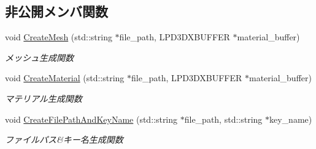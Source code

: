 \subsection*{非公開メンバ関数}
\begin{DoxyCompactItemize}
\item 
void \mbox{\hyperlink{class_model_x_object_a9808ef050cd3123ce72d8de2e07009da}{Create\+Mesh}} (std\+::string $\ast$file\+\_\+path, L\+P\+D3\+D\+X\+B\+U\+F\+F\+ER $\ast$material\+\_\+buffer)
\begin{DoxyCompactList}\small\item\em メッシュ生成関数 \end{DoxyCompactList}\item 
void \mbox{\hyperlink{class_model_x_object_a7ecf8b8515d10e21566e1d54b9dae5b0}{Create\+Material}} (std\+::string $\ast$file\+\_\+path, L\+P\+D3\+D\+X\+B\+U\+F\+F\+ER $\ast$material\+\_\+buffer)
\begin{DoxyCompactList}\small\item\em マテリアル生成関数 \end{DoxyCompactList}\item 
void \mbox{\hyperlink{class_model_x_object_ac72ea2bf21c475ba8e9d0b3bf8b9aef4}{Create\+File\+Path\+And\+Key\+Name}} (std\+::string $\ast$file\+\_\+path, std\+::string $\ast$key\+\_\+name)
\begin{DoxyCompactList}\small\item\em ファイルパス\&キー名生成関数 \end{DoxyCompactList}\end{DoxyCompactItemize}
